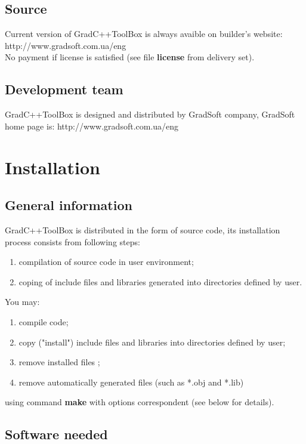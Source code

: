 \documentclass[10pt]{article}
\begin{document}
\subsection{Source}

Current version of GradC++ToolBox is always avaible on builder's website: http://www.gradsoft.com.ua/eng \\

\noindent
No payment if license is satisfied (see file {\bf license} from delivery set).


\subsection{Development team}            

GradC++ToolBox is designed and distributed by GradSoft company, GradSoft home page is: http://www.gradsoft.com.ua/eng


\section{ Installation }

\subsection{ General information }

GradC++ToolBox is distributed in the form of source code,
its installation process consists from following steps:
\begin{enumerate}
\item compilation of source code in user environment;
\item coping of include files and libraries generated into directories defined by user.
\end{enumerate}
You may:
\begin{enumerate}
\item compile code;
\item copy ("install") include files and libraries into directories defined by user;
\item remove installed files ;
\item remove automatically generated files (such as *.obj and *.lib)
\end{enumerate}
using command {\bf make} with options correspondent (see below for details).


\subsection{ Software needed }
\end{document}
